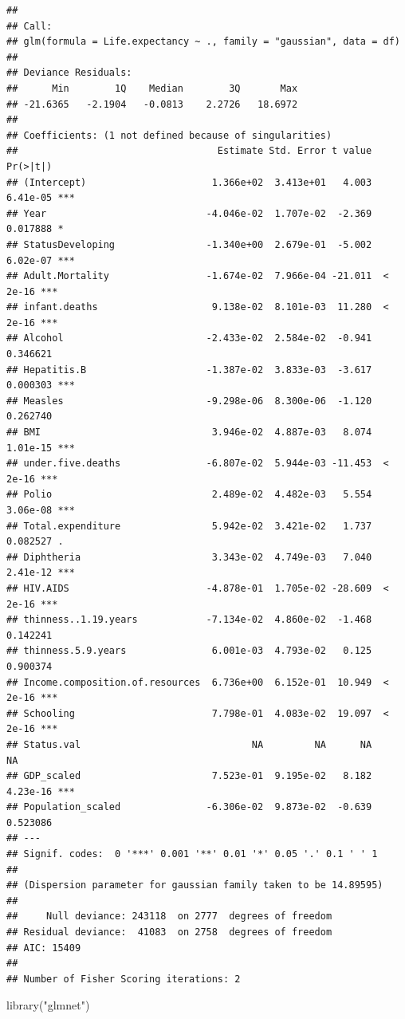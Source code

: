 \documentclass[
]{article}
\newenvironment{Shaded}{\begin{snugshade}}{\end{snugshade}}
\newcommand{\FunctionTok}[1]{\textcolor[rgb]{0.00,0.00,0.00}{#1}}
\newcommand{\NormalTok}[1]{#1}
\newcommand{\StringTok}[1]{\textcolor[rgb]{0.31,0.60,0.02}{#1}}
\begin{document}
\begin{verbatim}
## 
## Call:
## glm(formula = Life.expectancy ~ ., family = "gaussian", data = df)
## 
## Deviance Residuals: 
##      Min        1Q    Median        3Q       Max  
## -21.6365   -2.1904   -0.0813    2.2726   18.6972  
## 
## Coefficients: (1 not defined because of singularities)
##                                   Estimate Std. Error t value Pr(>|t|)    
## (Intercept)                      1.366e+02  3.413e+01   4.003 6.41e-05 ***
## Year                            -4.046e-02  1.707e-02  -2.369 0.017888 *  
## StatusDeveloping                -1.340e+00  2.679e-01  -5.002 6.02e-07 ***
## Adult.Mortality                 -1.674e-02  7.966e-04 -21.011  < 2e-16 ***
## infant.deaths                    9.138e-02  8.101e-03  11.280  < 2e-16 ***
## Alcohol                         -2.433e-02  2.584e-02  -0.941 0.346621    
## Hepatitis.B                     -1.387e-02  3.833e-03  -3.617 0.000303 ***
## Measles                         -9.298e-06  8.300e-06  -1.120 0.262740    
## BMI                              3.946e-02  4.887e-03   8.074 1.01e-15 ***
## under.five.deaths               -6.807e-02  5.944e-03 -11.453  < 2e-16 ***
## Polio                            2.489e-02  4.482e-03   5.554 3.06e-08 ***
## Total.expenditure                5.942e-02  3.421e-02   1.737 0.082527 .  
## Diphtheria                       3.343e-02  4.749e-03   7.040 2.41e-12 ***
## HIV.AIDS                        -4.878e-01  1.705e-02 -28.609  < 2e-16 ***
## thinness..1.19.years            -7.134e-02  4.860e-02  -1.468 0.142241    
## thinness.5.9.years               6.001e-03  4.793e-02   0.125 0.900374    
## Income.composition.of.resources  6.736e+00  6.152e-01  10.949  < 2e-16 ***
## Schooling                        7.798e-01  4.083e-02  19.097  < 2e-16 ***
## Status.val                              NA         NA      NA       NA    
## GDP_scaled                       7.523e-01  9.195e-02   8.182 4.23e-16 ***
## Population_scaled               -6.306e-02  9.873e-02  -0.639 0.523086    
## ---
## Signif. codes:  0 '***' 0.001 '**' 0.01 '*' 0.05 '.' 0.1 ' ' 1
## 
## (Dispersion parameter for gaussian family taken to be 14.89595)
## 
##     Null deviance: 243118  on 2777  degrees of freedom
## Residual deviance:  41083  on 2758  degrees of freedom
## AIC: 15409
## 
## Number of Fisher Scoring iterations: 2
\end{verbatim}

\begin{Shaded}
\begin{Highlighting}[]
\FunctionTok{library}\NormalTok{(}\StringTok{"glmnet"}\NormalTok{)}
\end{Highlighting}
\end{Shaded}
\end{document}

